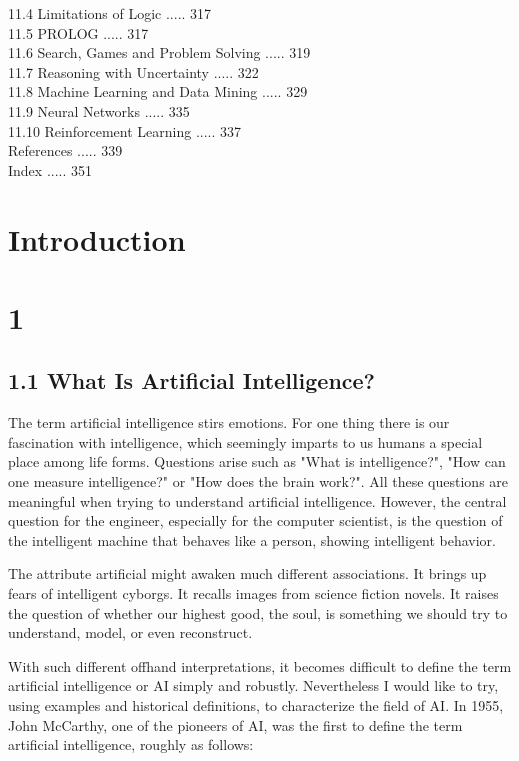 \documentclass[10pt]{book}
\begin{document}
11.4 Limitations of Logic ..... 317\\
11.5 PROLOG ..... 317\\
11.6 Search, Games and Problem Solving ..... 319\\
11.7 Reasoning with Uncertainty ..... 322\\
11.8 Machine Learning and Data Mining ..... 329\\
11.9 Neural Networks ..... 335\\
11.10 Reinforcement Learning ..... 337\\
References ..... 339\\
Index ..... 351

\section*{Introduction}
\section*{1}
\subsection*{1.1 What Is Artificial Intelligence?}
The term artificial intelligence stirs emotions. For one thing there is our fascination with intelligence, which seemingly imparts to us humans a special place among life forms. Questions arise such as "What is intelligence?", "How can one measure intelligence?" or "How does the brain work?". All these questions are meaningful when trying to understand artificial intelligence. However, the central question for the engineer, especially for the computer scientist, is the question of the intelligent machine that behaves like a person, showing intelligent behavior.

The attribute artificial might awaken much different associations. It brings up fears of intelligent cyborgs. It recalls images from science fiction novels. It raises the question of whether our highest good, the soul, is something we should try to understand, model, or even reconstruct.

With such different offhand interpretations, it becomes difficult to define the term artificial intelligence or AI simply and robustly. Nevertheless I would like to try, using examples and historical definitions, to characterize the field of AI. In 1955, John McCarthy, one of the pioneers of AI, was the first to define the term artificial intelligence, roughly as follows:
\end{document}
